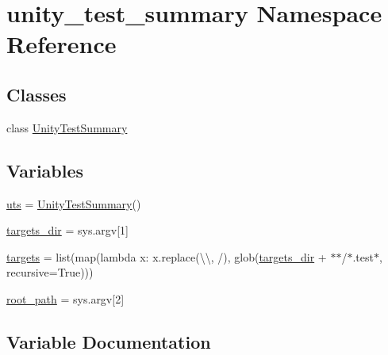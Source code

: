\hypertarget{namespaceunity__test__summary}{}\section{unity\+\_\+test\+\_\+summary Namespace Reference}
\label{namespaceunity__test__summary}
\subsection*{Classes}
\begin{DoxyCompactItemize}
\item 
class \hyperlink{classunity__test__summary_1_1_unity_test_summary}{Unity\+Test\+Summary}
\end{DoxyCompactItemize}
\subsection*{Variables}
\begin{DoxyCompactItemize}
\item 
\hyperlink{namespaceunity__test__summary_ac32d80a4d2e00ce829ad0c119fe19bc3}{uts} = \hyperlink{classunity__test__summary_1_1_unity_test_summary}{Unity\+Test\+Summary}()
\item 
\hyperlink{namespaceunity__test__summary_a45730122ae42bdf203b5ae5525b77736}{targets\+\_\+dir} = sys.\+argv\mbox{[}1\mbox{]}
\item 
\hyperlink{namespaceunity__test__summary_afdc9304023381cdb89317b5dd703f2ff}{targets} = list(map(lambda x\+: x.\+replace(\textquotesingle{}\textbackslash{}\textbackslash{}\textquotesingle{}, \textquotesingle{}/\textquotesingle{}), glob(\hyperlink{namespaceunity__test__summary_a45730122ae42bdf203b5ae5525b77736}{targets\+\_\+dir} + \textquotesingle{}$\ast$$\ast$/$\ast$.test$\ast$\textquotesingle{}, recursive=True)))
\item 
\hyperlink{namespaceunity__test__summary_abbd92d7443fd9bef9c95bb52f3a6a4f7}{root\+\_\+path} = sys.\+argv\mbox{[}2\mbox{]}
\end{DoxyCompactItemize}


\subsection{Variable Documentation}
\mbox{\label{namespaceunity__test__summary_abbd92d7443fd9bef9c95bb52f3a6a4f7}} 
